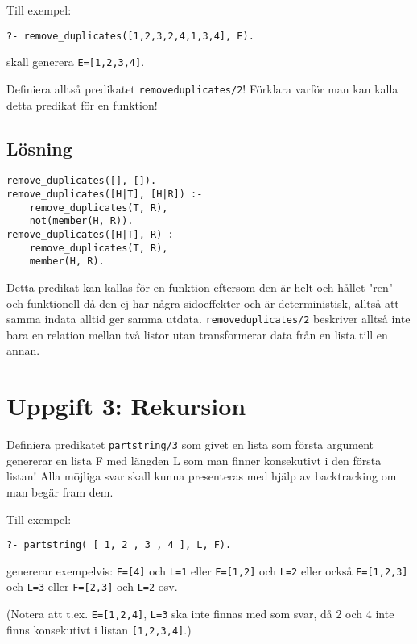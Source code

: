 \documentclass[12pt]{article}
\begin{document}
Till exempel:
\begin{verbatim}
?- remove_duplicates([1,2,3,2,4,1,3,4], E).
\end{verbatim}

skall generera \texttt{E=[1,2,3,4]}.

Definiera alltså predikatet \texttt{remove\textunderscore duplicates\slash 2}!
Förklara varför man kan kalla detta predikat för en funktion!

\subsection*{Lösning}

\begin{verbatim}
remove_duplicates([], []).
remove_duplicates([H|T], [H|R]) :-
    remove_duplicates(T, R),
    not(member(H, R)).
remove_duplicates([H|T], R) :-
    remove_duplicates(T, R),
    member(H, R).
\end{verbatim}

Detta predikat kan kallas för en funktion eftersom den är helt och hållet "ren" och funktionell då den ej har några sidoeffekter och är deterministisk, alltså att samma indata alltid ger samma utdata. \texttt{remove\textunderscore duplicates/2} beskriver alltså inte bara en relation mellan två listor utan transformerar data från en lista till en annan.

\section*{Uppgift 3: Rekursion}

Definiera predikatet \texttt{partstring/3} som givet en lista som första 
argument genererar en lista F med längden L som man finner
konsekutivt i den första listan!
Alla mōjliga svar skall kunna presenteras med hjälp av 
backtracking om man begär fram dem.

Till exempel:

\begin{verbatim}
?- partstring( [ 1, 2 , 3 , 4 ], L, F).
\end{verbatim}

genererar exempelvis:
\texttt{F=[4]} och \texttt{L=1}
eller \texttt{F=[1,2]} och \texttt{L=2}
eller också \texttt{F=[1,2,3]} och \texttt{L=3}
eller \texttt{F=[2,3]} och \texttt{L=2} 
osv.

(Notera att t.ex. \texttt{E=[1,2,4]}, \texttt{L=3} ska inte finnas med som svar, 
då 2 och 4 inte finns konsekutivt i listan \texttt{[1,2,3,4]}.)
\end{document}
